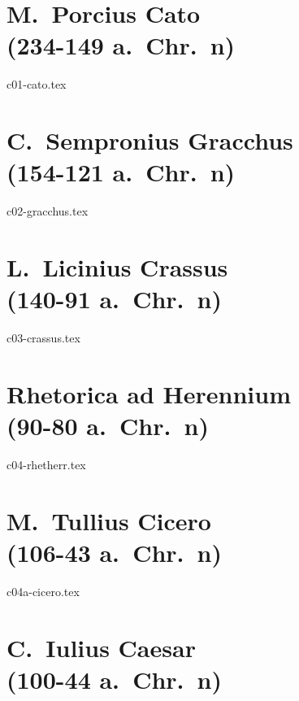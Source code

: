 \documentclass[a4paper,12pt,twoside]{report}
\begin{document}





\chapter[Cato]{M.\ Porcius Cato \\(234-149 a.~Chr.~n)}

{c01-cato.tex}

\chapter[C.\ Gracchus]{C.\ Sempronius Gracchus \\(154-121 a.~Chr.~n)}

{c02-gracchus.tex}

\chapter[Crassus]{L.\ Licinius Crassus \\(140-91 a.~Chr.~n)}

{c03-crassus.tex}

\chapter[Rhetorica ad Herennium]{Rhetorica ad Herennium \\(90-80 a.~Chr.~n)}

{c04-rhetherr.tex}

\chapter[Cicero]{M.\ Tullius Cicero \\(106-43 a.~Chr.~n)}

{c04a-cicero.tex}

\chapter[Caesar]{C.\ Iulius Caesar \\(100-44 a.~Chr.~n)}
\end{document}
